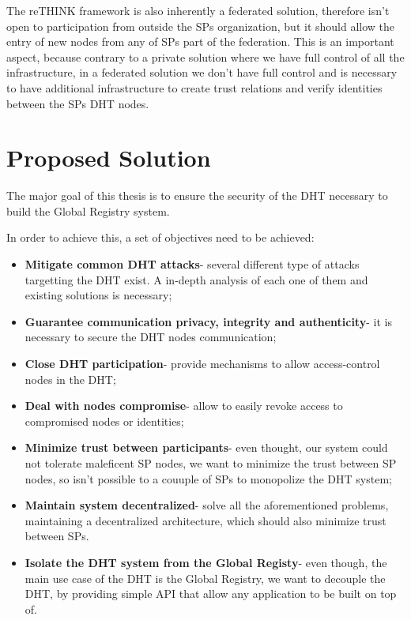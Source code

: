 The reTHINK framework is also inherently a federated solution, therefore isn't open to participation from outside the \acp{SP} organization, but it should allow the entry of new nodes from any of \acp{SP} part of the federation.
This is an important aspect, because contrary to a private solution where we have full control of all the infrastructure, in a federated solution we don't have full control and is necessary to have additional infrastructure to create trust relations and verify identities between the \acp{SP} \ac{DHT} nodes.

\section{Proposed Solution}
\label{section:proposed}

The major goal of this thesis is to ensure the security of the \ac{DHT} necessary to build the Global Registry system.

In order to achieve this, a set of objectives need to be achieved:

\begin{itemize}
  \item \textbf{Mitigate common \ac{DHT} attacks}- several different type of attacks targetting the \ac{DHT} exist. A in-depth analysis of each one of them and existing solutions is necessary;
	\item \textbf{Guarantee communication privacy, integrity and authenticity}- it is necessary to secure the \ac{DHT} nodes communication;
	\item \textbf{Close DHT participation}- provide mechanisms to allow access-control nodes in the \ac{DHT};
	\item \textbf{Deal with nodes compromise}- allow to easily revoke access to compromised nodes or identities;
	\item \textbf{Minimize trust between participants}- even thought, our system could not tolerate maleficent \ac{SP} nodes, we want to minimize the trust between \ac{SP} nodes, so isn't possible to a couuple of \acp{SP} to monopolize the DHT system;
  \item \textbf{Maintain system decentralized}- solve all the aforementioned problems, maintaining a decentralized architecture, which should also minimize trust between \acp{SP}.
	\item \textbf{Isolate the DHT system from the Global Registy}- even though, the main use case of the DHT is the Global Registry, we want to decouple the DHT, by providing simple API that allow any application to be built on top of.
\end{itemize}

